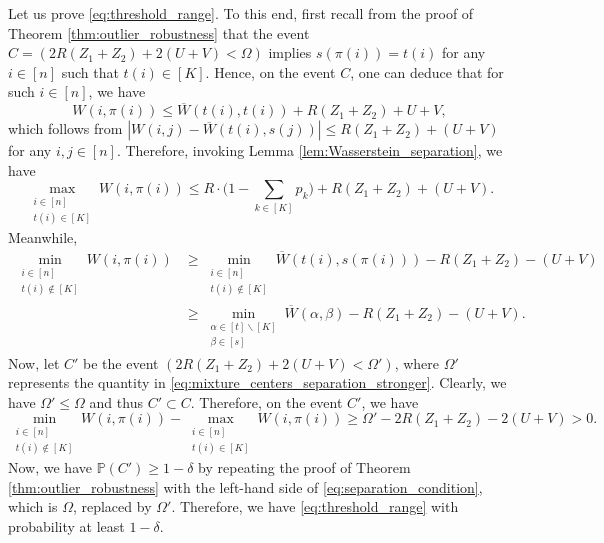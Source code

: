 \documentclass[11pt,letterpaper]{article}
\theoremstyle{definition}
\numberwithin{equation}{section}
\renewcommand{\P}{\mathbb{P}}
\begin{document}
Let us prove \eqref{eq:threshold_range}. To this end, first recall from the proof of Theorem \ref{thm:outlier_robustness} that the event $C = (2 R (Z_1 + Z_2) + 2 (U + V) < \Omega)$ implies $s(\pi(i)) = t(i)$ for any $i \in [n]$ such that $t(i) \in [K]$. Hence, on the event $C$, one can deduce that for such $i \in [n]$, we have
\begin{equation*}
    W(i, \pi(i)) \le \overline{W}(t(i), t(i)) + R (Z_1 + Z_2) + U + V,
\end{equation*}
which follows from $|W(i, j) - \overline{W}(t(i), s(j))| \le R (Z_1 + Z_2) + (U + V)$ for any $i, j \in [n]$. Therefore, invoking Lemma \ref{lem:Wasserstein_separation}, we have
\begin{equation*}
    \max_{\substack{i \in [n] \\ t(i) \in [K]}} W(i, \pi(i)) \le R \cdot \bigg(1 - \sum_{k \in [K]} p_k \bigg) + R (Z_1 + Z_2) + (U + V).
\end{equation*}
Meanwhile, 
\begin{equation*}
    \begin{split}
        \min_{\substack{i \in [n] \\ t(i) \notin [K]}} W(i, \pi(i)) 
        & \ge \min_{\substack{i \in [n] \\ t(i) \notin [K]}} \overline{W}(t(i), s(\pi(i))) - R (Z_1 + Z_2) - (U + V) \\
        & \ge \min_{\substack{\alpha \in [t] \backslash [K] \\ \beta \in [s]}} \overline{W}(\alpha, \beta) - R (Z_1 + Z_2) - (U + V).
    \end{split}
\end{equation*}
Now, let $C'$ be the event $(2 R (Z_1 + Z_2) + 2 (U + V) < \Omega')$, where $\Omega'$ represents the quantity in \eqref{eq:mixture_centers_separation_stronger}. Clearly, we have $\Omega' \le \Omega$ and thus $C' \subset C$. Therefore, on the event $C'$, we have 
\begin{equation*}
    \min_{\substack{i \in [n] \\ t(i) \notin [K]}} W(i, \pi(i)) - \max_{\substack{i \in [n] \\ t(i) \in [K]}} W(i, \pi(i)) \ge \Omega' - 2 R (Z_1 + Z_2) - 2 (U + V) > 0.
\end{equation*}
Now, we have $\P(C') \ge 1 - \delta$ by repeating the proof of Theorem \ref{thm:outlier_robustness} with the left-hand side of \eqref{eq:separation_condition}, which is $\Omega$, replaced by $\Omega'$. Therefore, we have \eqref{eq:threshold_range} with probability at least $1 - \delta$.




%


\end{document}
